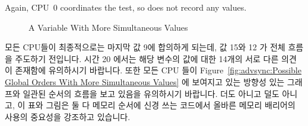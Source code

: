 Again, CPU~0 coordinates the test, so does not record any values.
\fi

\begin{figure}
\centering
{}
\caption{A Variable With More Simultaneous Values}
\end{figure}

모든 CPU들이 최종적으로는 마지막 값 9에 합의하게 되는데, 값 15와 12 가 전체
흐름을 주도하기 전입니다.
시간 20 에서는 해당 변수의 값에 대한 14개의 서로 다른 의견이 존재함에
유의하시기 바랍니다.
또한 모든 CPU 들이
Figure~\ref{fig:advsync:Possible Global Orders With More Simultaneous Values}
에 보여지고 있는 방향성 있는 그래프와 일관된 순서의 흐름을 보고 있음을
유의하시기 바랍니다.
더도 아니고 덜도 아니고, 이 표와 그림은 둘 다 메모리 순서에 신경 쓰는 코드에서
올바른 메모리 배리어의 사용의 중요성을 강조하고 있습니다.
\iffalse

